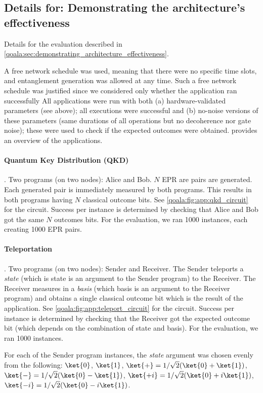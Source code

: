 \subsection{Details for: Demonstrating the architecture's effectiveness}
\label{qoala:sec:app:details_6_1}
Details for the evaluation described in \cref{qoala:sec:demonstrating_architecture_effectiveness}.

A free network schedule was used, meaning that there were no specific time slots, and entanglement generation was allowed at any time.
Such a free network schedule was justified since we considered only whether the application ran successfully
All applications were run with both (a) hardware-validated parameters (see above); all executions were successful and (b) no-noise versions of these parameters (same durations of all operations but no decoherence nor gate noise); these were used to check if the expected outcomes were obtained.
 provides an overview of the applications.

\paragraph{Quantum Key Distribution (QKD)}. 
Two programs (on two nodes): Alice and Bob. $N$ EPR are pairs are generated. Each generated pair is immediately measured by both programs.
This results in both programs having $N$ classical outcome bits.
See \cref{qoala:fig:app:qkd_circuit} for the circuit.
Success per instance is determined by checking that Alice and Bob got the same $N$ outcomes bits.
For the evaluation, we ran 1000 instances, each creating 1000 EPR pairs.

\paragraph{Teleportation}.
Two programs (on two nodes): Sender and Receiver. The Sender teleports a \textit{state} (which is state is an argument to the Sender program) to the Receiver.
The Receiver measures in a \textit{basis} (which basis is an argument to the Receiver program) and obtains a single classical outcome bit which is the result of the application.
See \cref{qoala:fig:app:teleport_circuit} for the circuit.
Success per instance is determined by checking that the Receiver got the expected outcome bit (which depends on the combination of state and basis).
For the evaluation, we ran 1000 instances.

For each of the Sender program instances, the \textit{state} argument was chosen evenly from the following:
$\ket{0}$,
$\ket{1}$,
$\ket{+} = 1/\sqrt{2} (\ket{0} + \ket{1})$,
$\ket{-} = 1/\sqrt{2} (\ket{0} - \ket{1})$,
$\ket{+i} = 1/\sqrt{2} (\ket{0} + i \ket{1})$,
$\ket{-i} = 1/\sqrt{2} (\ket{0} - i \ket{1})$.

